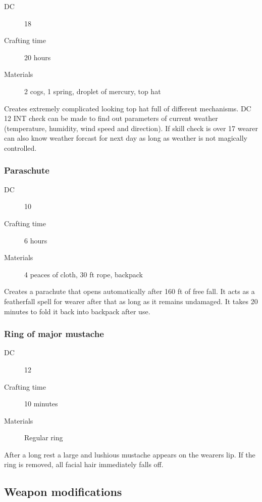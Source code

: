 \begin{description}
\item [DC] 18 \nature
\item [Crafting time] 20 hours
\item [Materials] 2 cogs, 1 spring, droplet of mercury, top hat
\end{description}

Creates extremely complicated looking top hat full of different mechanisms. DC 12 INT check can be made to find out parameters of current weather (temperature, humidity, wind speed and direction). If skill check is over 17 wearer can also know weather forcast for next day as long as weather is not magically controlled.

\subsubsection{Paraschute}

\begin{description}
\item [DC] 10 \sleightofhand
\item [Crafting time] 6 hours
\item [Materials] 4 peaces of cloth, 30 ft rope, backpack
\end{description}

Creates a parachute that opens automatically after 160 ft of free fall. It acts as a featherfall spell for wearer after that as long as it remains undamaged. It takes 20 minutes to fold it back into backpack after use.

\subsubsection{Ring of major mustache}

\begin{description}
\item [DC] 12 \arcana
\item [Crafting time] 10 minutes
\item [Materials] Regular ring
\end{description}

After a long rest a large and lushious mustache appears on the wearers lip. If the ring is removed, all facial hair immediately falls off.

\subsection{Weapon modifications}

